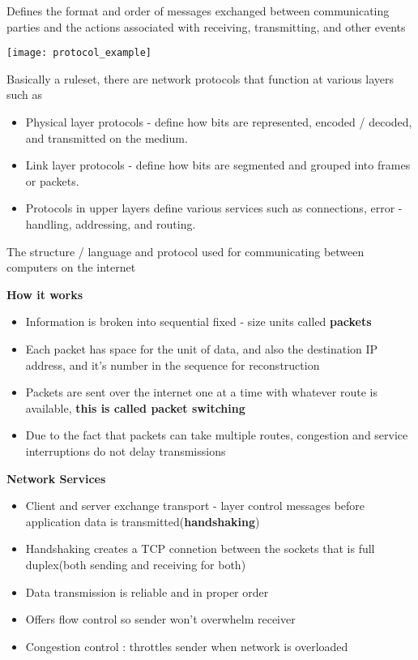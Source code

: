 \documentclass[12pt] {report}
\begin{document}
{
    Defines the format and order of messages exchanged between communicating parties and the actions associated with receiving, transmitting, and other events

    \texttt{[image: protocol\_example]}

    Basically a ruleset, there are network protocols that function at various layers such as
    \begin{itemize}
    \item Physical layer protocols - define how bits are represented, encoded / decoded, and transmitted on the medium.
    \item Link layer protocols - define how bits are segmented and grouped into frames or packets.
    \item Protocols in upper layers define various services such as connections, error - handling, addressing, and routing.
    \end{itemize}
}
{

    The structure / language and protocol used for communicating between computers on the internet

    \textbf{How it works}
\begin{itemize}
\item Information is broken into sequential fixed - size units called \textbf{packets}

\item Each packet has space for the unit of data, and also the destination IP address, and it's number in the sequence for reconstruction
    \item Packets are sent over the internet one at a time with whatever route is available, \textbf{this is called packet switching}

\item Due to the fact that packets can take multiple routes, congestion and service interruptions do
    not delay transmissions
    \end{itemize}
\textbf{Network Services}
\begin{itemize}
\item Client and server exchange transport - layer control messages before application data is transmitted(\textbf{handshaking})

    \item Handshaking creates a TCP connetion between the sockets that is full duplex(both sending and receiving for both)
        \item Data transmission is reliable and in proper order
        \item Offers flow control so sender won't overwhelm receiver
\item Congestion control :
        throttles sender when network is overloaded
        \end{itemize}
}
\end{document}
